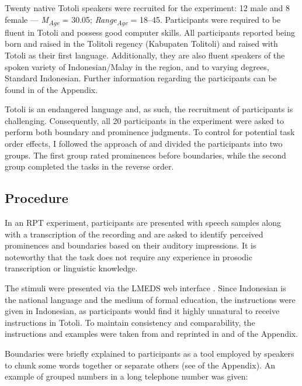 Twenty native Totoli speakers were recruited for the experiment: 12 male and 8 female --- \textit{M\textsubscript{Age}} = 30.05; \textit{Range\textsubscript{Age}} = 18--45.
Participants were required to be fluent in Totoli and possess good computer skills. All participants reported being born and raised in the Tolitoli regency (Kabupaten Tolitoli) and raised with Totoli as their first language. Additionally, they are also fluent speakers of the spoken variety of Indonesian/Malay in the region, and to varying degrees, Standard Indonesian. Further information regarding the participants can be found in   of the Appendix.


Totoli is an endangered language and, as such, the recruitment of participants is challenging. Consequently, all 20 participants in the experiment were asked to perform both boundary and prominence judgments. To control for potential task order effects, I followed the approach of \citet{mo2008naive} and divided the participants into two groups. The first group rated prominences before boundaries, while the second group completed the tasks in the reverse order.




\subsection{Procedure}
\label{Procedure}


In an RPT experiment, participants are presented with speech samples along with a transcription of the recording and are asked to identify perceived prominences and boundaries based on their auditory impressions. It is noteworthy that the task does not require any experience in prosodic transcription or linguistic knowledge.

The stimuli were presented via the LMEDS  web interface \citep[206]{cole2017crowd, mahrt2016lmeds}. Since Indonesian is the national language and the medium of formal education, the instructions were given in Indonesian, as participants would find it highly unnatural to receive instructions in Totoli. To maintain consistency and comparability, the instructions and examples were taken from \citet[409--411]{riesberg2018perception} and reprinted in   and  of the Appendix. 



Boundaries were briefly explained to participants as a tool employed by speakers to chunk some words together or separate others (see   of the Appendix). An example of grouped numbers in a long telephone number was given: 



